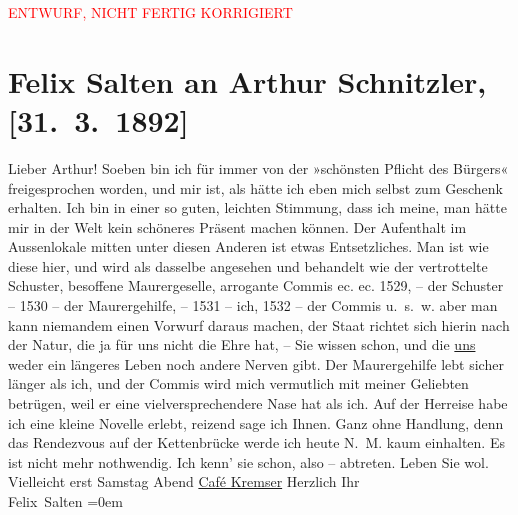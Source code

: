 
\begin{center}
            \textcolor{red}{ENTWURF, NICHT FERTIG KORRIGIERT}
                      \end{center}
            
         \renewcommand{\erwaehnteOrte}{Orte: Café Kremser, Wien}
         \renewcommand{\erwaehnteWerke}{}
               \section[Felix Salten an Arthur Schnitzler, {[}31. 3. 1892{]}]{ Felix Salten an Arthur Schnitzler, {[}31. 3. 1892{]}}\nopagebreak{}\rehead{ }\begin{ledgroupsized}[t]{13cm}\normalsize\beginnumbering \toendnotes[C]{\smallbreak\pagebreak[2]} 
\pstart
           \noindent{}{\pb}Lieber Arthur! Soeben bin ich für immer von der »schönsten Pflicht
               des Bürgers« freigesprochen worden, und mir ist, als hätte ich eben mich selbst zum
               Geschenk erhalten. Ich bin in einer so guten, leichten Stimmung, dass ich meine, man
               hätte mir in der Welt kein schöneres Präsent machen können. Der Aufenthalt {\pb}im Aussenlokale mitten unter diesen Anderen ist etwas Entsetzliches. Man
               ist wie diese hier, und wird als dasselbe angesehen und behandelt wie der
               vertrottelte Schuster, besoffene Maurergeselle, arrogante Commis ec. ec. 1529, – der
               Schuster – 1530 – der Maurergehilfe, – 1531 – ich, 1532 – der Commis u. s. w. aber
               man kann niemandem einen Vorwurf daraus machen, der Staat richtet {\pb}sich
               hierin nach der Natur, die ja für uns nicht die Ehre hat, – Sie wissen schon, und die
                  \uline{uns} weder ein längeres Leben noch andere Nerven
               gibt. Der Maurergehilfe lebt sicher länger als ich, und der Commis wird mich
               vermutlich mit meiner Geliebten betrügen, weil er eine vielversprechendere Nase hat
               als ich. Auf der Herreise habe ich eine kleine Novelle erlebt, reizend sage {\pb}ich Ihnen. Ganz ohne Handlung,
               denn das Rendezvous auf der Kettenbrücke werde ich heute N. M. kaum einhalten. Es ist
               nicht mehr nothwendig. Ich kenn’ sie schon, also – abtreten.\pend
           \pstart
           Leben Sie wol. Vielleicht erst Samstag{ }Abend{ }\uline{Café Kremser}\pend
           \pstart
           Herzlich Ihr {\\[\baselineskip]}\spacefill\mbox{Felix Salten}\pend
           \leftskip=0em{}
         
         \endnumbering{}\end{ledgroupsized}\begin{anhang}\end{anhang}\newcommand{\dateiname}{L03108}\newcommand{\titel}{Felix Salten an Arthur Schnitzler, [31. 3. 1892]}\newcommand{\editorInnen}{Martin Anton Müller und Laura Untner}
      